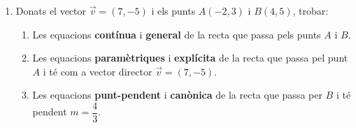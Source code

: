 \documentclass[12pt,a4paper]{article}
\newif\ifsolutions
\newcommand{\solucio}[1]{%
  \ifsolutions
    \begin{soluciobox}
      #1
    \end{soluciobox}
  \fi
}
\begin{document}
\begin{enumerate}[label=\textbf{\arabic*.}, leftmargin=*, itemsep=1.2em]

\item Donats el vector $\vec{v} = (7,-5)$ i els punts $A(-2,3)$ i $B(4,5)$, trobar:

\begin{enumerate}[label=\textbf{\alph*.}, itemsep=0.8em]

  \item Les equacions \textbf{contínua} i \textbf{general} de la recta que passa pels punts $A$ i $B$.

  \solucio{%
    El vector director $\overrightarrow{AB}$ és:
    \[
      \overrightarrow{AB} = B - A = (4-(-2),\; 5-3) = (6,\,2)
    \]
    \textbf{Equació contínua:}
    \[
      \frac{x-(-2)}{6} = \frac{y-3}{2}
      \quad\Longrightarrow\quad
      \boxed{\frac{x+2}{6} = \frac{y-3}{2}}
    \]
    \textbf{Equació general} (producte creuat i simplificació per 2):
    \[
      2(x+2) = 6(y-3)
      \;\Rightarrow\; 2x+4 = 6y-18
      \;\Rightarrow\;
      \boxed{x - 3y + 11 = 0}
    \]
  }

  \item Les equacions \textbf{paramètriques} i \textbf{explícita} de la recta que passa pel punt $A$
        i té com a vector director $\vec{v} = (7,-5)$.

  \solucio{%
    \textbf{Equacions paramètriques} (punt $A(-2,3)$, director $(7,-5)$):
    \[
      \boxed{\begin{cases} x = -2 + 7t \\ y = \phantom{-}3 - 5t \end{cases} \quad t\in\mathbb{R}}
    \]
    \textbf{Equació explícita}: aïllem $t$ de la primera equació:
    $t = \dfrac{x+2}{7}$, substituïm a la segona:
    \[
      y = 3 - 5\cdot\frac{x+2}{7} = \frac{21 - 5x - 10}{7}
      \quad\Longrightarrow\quad
      \boxed{y = -\tfrac{5}{7}\,x + \tfrac{11}{7}}
    \]
  }

  \item Les equacions \textbf{punt-pendent} i \textbf{canònica} de la recta que passa per $B$
        i té pendent $m = \dfrac{4}{3}$.

  \solucio{%
    \textbf{Equació punt-pendent} (punt $B(4,5)$, pendent $\frac{4}{3}$):
    \[
      \boxed{y - 5 = \frac{4}{3}(x-4)}
    \]
    El vector director associat al pendent $m = 4/3$ és $(3,4)$. L'\textbf{equació canònica}:
    \[
      \boxed{\frac{x}{\frac{1}{4}}-\frac{y}{\frac{1}{3}}=1}
    \]
  }


\end{enumerate}
\end{enumerate}
\end{document}
